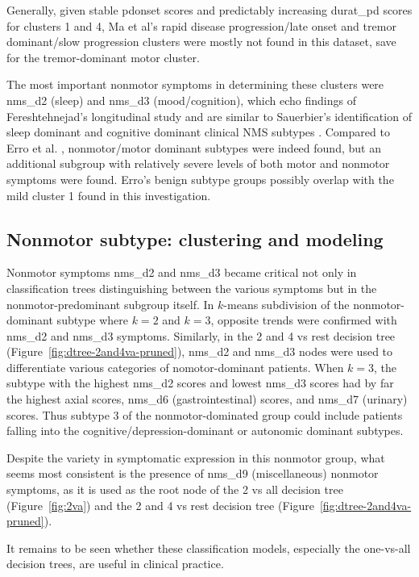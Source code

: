 \documentclass[preprint,3p]{elsarticle} %
\begin{document}
Generally, given stable pdonset scores and predictably increasing durat\_pd
scores for clusters 1 and 4, Ma et al's rapid disease
progression/late onset and tremor dominant/slow progression clusters
\cite{ma15} were mostly not found in this dataset, save for the tremor-dominant
motor cluster.

The most important nonmotor symptoms in determining these clusters were nms\_d2
(sleep) and nms\_d3 (mood/cognition), which echo findings of Fereshtehnejad's
longitudinal study \cite{fereshtehnejad15} and are similar to Sauerbier's
identification of sleep dominant and cognitive dominant clinical NMS subtypes
\cite{sauerbier15}. Compared to Erro et al. \cite{erro13}, nonmotor/motor
dominant subtypes were indeed found, but an additional subgroup with relatively
severe levels of both motor and nonmotor symptoms were found. Erro's benign
subtype groups possibly overlap with the mild cluster 1 found in this
investigation.

\subsection{Nonmotor subtype: clustering and modeling}
Nonmotor symptoms nms\_d2 and nms\_d3 became critical not only in
classification trees distinguishing between the various symptoms but in the
nonmotor-predominant subgroup itself. In $k$-means subdivision of the
nonmotor-dominant subtype where $k = 2$ and $k = 3$, opposite trends were
confirmed with nms\_d2 and nms\_d3 symptoms. Similarly, in the 2 and 4 vs rest
decision tree (Figure~\ref{fig:dtree-2and4va-pruned}), nms\_d2 and nms\_d3 nodes were
used to differentiate various categories of nomotor-dominant patients.
When $k = 3$, the subtype with the highest nms\_d2 scores and lowest
nms\_d3 scores had by far the highest axial scores, nms\_d6 (gastrointestinal)
scores, and nms\_d7 (urinary) scores. Thus subtype 3 of the nonmotor-dominated
group could include patients falling into the cognitive/depression-dominant or
autonomic dominant subtypes.

Despite the variety in symptomatic expression in this nonmotor group, what
seems most consistent is the presence of nms\_d9 (miscellaneous) nonmotor
symptoms, as it is used as the root node of the 2 vs all decision tree
(Figure~\ref{fig:2va}) and the 2 and 4 vs rest decision tree
(Figure~\ref{fig:dtree-2and4va-pruned}).

It remains to be seen whether these classification models, especially the one-vs-all decision
trees, are useful in clinical practice.
\end{document}
